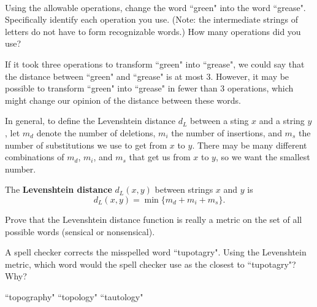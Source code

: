 \begin{activity} ~

\ba 

\item Using the allowable operations, change the word ``green" into the word ``grease". Specifically identify each operation you use. (Note: the intermediate strings of letters do not have to form recognizable words.) How many operations did you use?


\item If it took three operations to transform ``green" into ``grease", we could say that the distance between ``green" and ``grease" is at most 3. However, it may be possible to transform ``green" into ``grease" in fewer than 3 operations, which might change our opinion of the distance between these words. 

In general, to define the Levenshtein distance $d_L$ between a sting $x$ and a string $y$, let $m_d$ denote the number of deletions, $m_i$ the number of insertions, and $m_s$ the number of substitutions we use to get from $x$ to $y$. There may be many different combinations of $m_d$, $m_i$, and $m_s$ that get us from $x$ to $y$, so we want the smallest number. 

\begin{definition} The \textbf{Levenshtein distance} $d_L(x,y)$ between strings $x$ and $y$ is 
\[d_L(x,y) = \min\{m_d+m_i+m_s\}.\]
\end{definition}
Prove that the Levenshtein distance function is really a metric on the set of all possible words (sensical or nonsensical). 



\item  A spell checker corrects the misspelled word ``tupotagry". Using the Levenshtein metric, which word would the spell checker use as the closest to ``tupotagry"? Why?
\begin{center} ``topography" \hspace{0.25in} ``topology" \hspace{0.25in} ``tautology" \end{center}

\ea

\end{activity}

